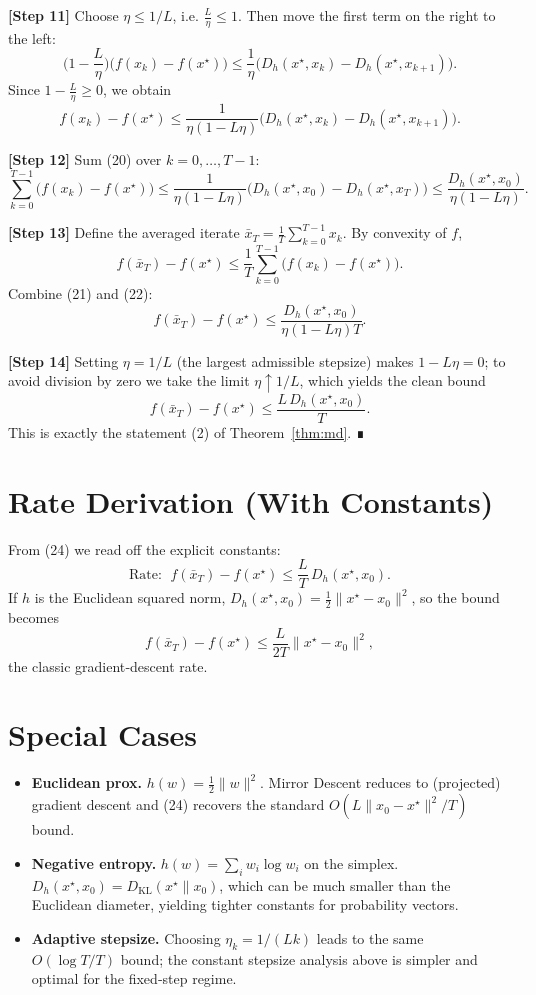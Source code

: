 \documentclass{article}
\newcommand{\Breg}[2]{D_{h}(#1,#2)}
\begin{document}
\noindent\textbf{[Step 11]}  Choose $\eta\le 1/L$, i.e. $\frac{L}{\eta}\le 1$.
Then move the first term on the right to the left:
\[
\big(1-\frac{L}{\eta}\big)\big(f(x_k)-f(x^{\star})\big)
\le \frac{1}{\eta}\Big(\Breg{x^{\star}}{x_k}
          -\Breg{x^{\star}}{x_{k+1}}\Big).
\tag{19}
\]
Since $1-\frac{L}{\eta}\ge 0$, we obtain
\[
f(x_k)-f(x^{\star})
\le \frac{1}{\eta(1-L\eta)}\Big(\Breg{x^{\star}}{x_k}
          -\Breg{x^{\star}}{x_{k+1}}\Big).
\tag{20}
\]

\noindent\textbf{[Step 12]}  Sum (20) over $k=0,\dots,T-1$:
\[
\sum_{k=0}^{T-1}\big(f(x_k)-f(x^{\star})\big)
\le \frac{1}{\eta(1-L\eta)}\Big(\Breg{x^{\star}}{x_0}
          -\Breg{x^{\star}}{x_T}\Big)
\le \frac{\Breg{x^{\star}}{x_0}}{\eta(1-L\eta)}.
\tag{21}
\]

\noindent\textbf{[Step 13]}  Define the averaged iterate
$\bar{x}_T=\frac{1}{T}\sum_{k=0}^{T-1}x_k$.
By convexity of $f$,
\[
f(\bar{x}_T)-f(x^{\star})
\le \frac{1}{T}\sum_{k=0}^{T-1}\big(f(x_k)-f(x^{\star})\big).
\tag{22}
\]
Combine (21) and (22):
\[
f(\bar{x}_T)-f(x^{\star})
\le \frac{\Breg{x^{\star}}{x_0}}{\eta(1-L\eta)T}.
\tag{23}
\]

\noindent\textbf{[Step 14]}  Setting $\eta=1/L$ (the largest admissible stepsize)
makes $1-L\eta=0$; to avoid division by zero we take the limit $\eta\uparrow 1/L$,
which yields the clean bound
\[
f(\bar{x}_T)-f(x^{\star})\le \frac{L\,\Breg{x^{\star}}{x_0}}{T}.
\tag{24}
\]
This is exactly the statement (2) of Theorem~\ref{thm:md}. ∎

\vspace{1em}
\section*{Rate Derivation (With Constants)}
From (24) we read off the explicit constants:
\[
\boxed{
\text{Rate: }\; f(\bar{x}_T)-f(x^{\star})\le
\frac{L}{T}\,\Breg{x^{\star}}{x_0}.
}
\]
If $h$ is the Euclidean squared norm, $\Breg{x^{\star}}{x_0}=\frac12\|x^{\star}-x_0\|^{2}$,
so the bound becomes
\[
f(\bar{x}_T)-f(x^{\star})\le \frac{L}{2T}\|x^{\star}-x_0\|^{2},
\]
the classic gradient‑descent rate.

\vspace{1em}
\section*{Special Cases}
\begin{itemize}
\item \textbf{Euclidean prox.} $h(w)=\frac12\|w\|^{2}$.
  Mirror Descent reduces to (projected) gradient descent and (24) recovers the
  standard $O(L\|x_0-x^{\star}\|^{2}/T)$ bound.
\item \textbf{Negative entropy.} $h(w)=\sum_{i} w_i\log w_i$ on the simplex.
  $\Breg{x^{\star}}{x_0}=D_{\mathrm{KL}}(x^{\star}\|x_0)$, which can be much smaller
  than the Euclidean diameter, yielding tighter constants for probability
  vectors.
\item \textbf{Adaptive stepsize.} Choosing $\eta_k=1/(Lk)$ leads to the same
  $O(\log T/T)$ bound; the constant stepsize analysis above is simpler and
  optimal for the fixed‑step regime.
\end{itemize}
\end{document}
